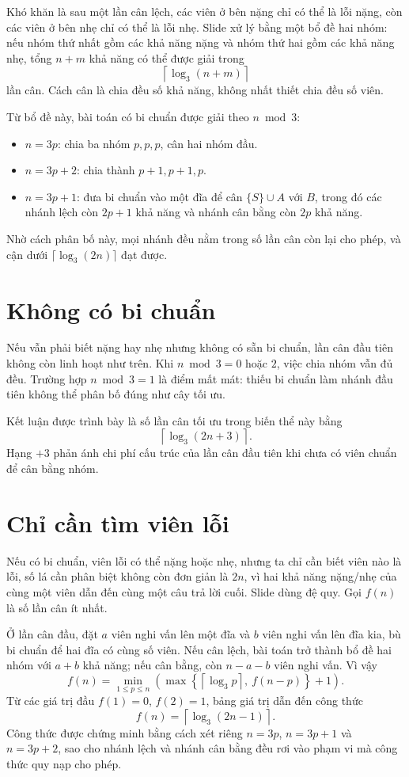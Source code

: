 \documentclass[11pt]{article}
\begin{document}
Khó khăn là sau một lần cân lệch, các viên ở bên nặng chỉ có thể là lỗi nặng,
còn các viên ở bên nhẹ chỉ có thể là lỗi nhẹ. Slide xử lý bằng một bổ đề hai
nhóm: nếu nhóm thứ nhất gồm các khả năng nặng và nhóm thứ hai gồm các khả
năng nhẹ, tổng \(n+m\) khả năng có thể được giải trong
\[
  \left\lceil\log_3(n+m)\right\rceil
\]
lần cân. Cách cân là chia đều số khả năng, không nhất thiết chia đều số viên.

Từ bổ đề này, bài toán có bi chuẩn được giải theo \(n\bmod 3\):
\begin{itemize}
  \item \(n=3p\): chia ba nhóm \(p,p,p\), cân hai nhóm đầu.
  \item \(n=3p+2\): chia thành \(p+1,p+1,p\).
  \item \(n=3p+1\): đưa bi chuẩn vào một đĩa để cân
  \(\{S\}\cup A\) với \(B\), trong đó các nhánh lệch còn \(2p+1\) khả năng
  và nhánh cân bằng còn \(2p\) khả năng.
\end{itemize}
Nhờ cách phân bố này, mọi nhánh đều nằm trong số lần cân còn lại cho phép,
và cận dưới \(\lceil\log_3(2n)\rceil\) đạt được.

\section{Không có bi chuẩn}

Nếu vẫn phải biết nặng hay nhẹ nhưng không có sẵn bi chuẩn, lần cân đầu tiên
không còn linh hoạt như trên. Khi \(n\bmod 3=0\) hoặc \(2\), việc chia nhóm
vẫn đủ đều. Trường hợp \(n\bmod 3=1\) là điểm mất mát: thiếu bi chuẩn làm
nhánh đầu tiên không thể phân bố đúng như cây tối ưu.

Kết luận được trình bày là số lần cân tối ưu trong biến thể này bằng
\[
  \left\lceil\log_3(2n+3)\right\rceil .
\]
Hạng \(+3\) phản ánh chi phí cấu trúc của lần cân đầu tiên khi chưa có viên
chuẩn để cân bằng nhóm.

\section{Chỉ cần tìm viên lỗi}

Nếu có bi chuẩn, viên lỗi có thể nặng hoặc nhẹ, nhưng ta chỉ cần biết viên
nào là lỗi, số lá cần phân biệt không còn đơn giản là \(2n\), vì hai khả năng
nặng/nhẹ của cùng một viên dẫn đến cùng một câu trả lời cuối. Slide dùng đệ
quy. Gọi \(f(n)\) là số lần cân ít nhất.

Ở lần cân đầu, đặt \(a\) viên nghi vấn lên một đĩa và \(b\) viên nghi vấn lên
đĩa kia, bù bi chuẩn để hai đĩa có cùng số viên. Nếu cân lệch, bài toán trở
thành bổ đề hai nhóm với \(a+b\) khả năng; nếu cân bằng, còn
\(n-a-b\) viên nghi vấn. Vì vậy
\[
  f(n)=\min_{1\le p\le n}
  \left(
    \max\left\{\left\lceil\log_3 p\right\rceil,\ f(n-p)\right\}+1
  \right).
\]
Từ các giá trị đầu \(f(1)=0\), \(f(2)=1\), bảng giá trị dẫn đến công thức
\[
  f(n)=\left\lceil\log_3(2n-1)\right\rceil .
\]
Công thức được chứng minh bằng cách xét riêng \(n=3p\), \(n=3p+1\) và
\(n=3p+2\), sao cho nhánh lệch và nhánh cân bằng đều rơi vào phạm vi mà
công thức quy nạp cho phép.
\end{document}
